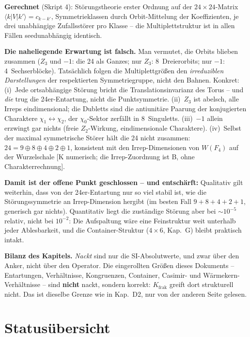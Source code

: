\documentclass[11pt]{report}
\begin{document}
\textbf{Gerechnet} (Skript 4): Störungstheorie erster Ordnung auf
der $24\times24$-Matrix $\langle k|V|k'\rangle = c_{k-k'}$,
Symmetrieklassen durch Orbit-Mittelung der Koeffizienten, je drei
unabhängige Zufallsstörer pro Klasse -- die Multiplettstruktur ist
in allen Fällen seedunabhängig identisch.

\textbf{Die naheliegende Erwartung ist falsch.} Man vermutet, die
Orbits blieben zusammen ($Z_3$ und $-1$: die 24 als Ganzes; nur
$Z_3$: 8~Dreierorbits; nur $-1$: 4~Sechserblöcke). Tatsächlich
folgen die Multiplettgrößen den \emph{irreduziblen Darstellungen}
der respektierten Symmetriegruppe, nicht den Bahnen. Konkret: (i)~Jede ortsabhängige Störung bricht die
Translationsinvarianz des Torus -- und \emph{die} trug die
24er-Entartung, nicht die Punktsymmetrie. (ii)~$Z_3$ ist abelsch,
alle Irreps eindimensional; die Dubletts sind die antiunitäre
Paarung der konjugierten Charaktere $\chi_1\leftrightarrow\chi_2$,
der $\chi_0$-Sektor zerfällt in 8~Singuletts. (iii)~$-1$ allein
erzwingt gar nichts (freie $Z_2$-Wirkung, eindimensionale
Charaktere). (iv)~Selbst der maximal symmetrische Störer hält die
24 nicht zusammen: $24 = 9\oplus8\oplus4\oplus2\oplus1$,
konsistent mit den Irrep-Dimensionen von $W(F_4)$ auf der
Wurzelschale [K numerisch; die Irrep-Zuordnung ist B, ohne
Charakterrechnung].

\textbf{Damit ist der offene Punkt geschlossen -- und entschärft:}
Qualitativ gilt weiterhin, dass von der 24er-Entartung nur so viel
stabil ist, wie die Störungssymmetrie an Irrep-Dimension hergibt
(im besten Fall $9+8+4+2+1$, generisch gar nichts). Quantitativ
liegt die zuständige Störung aber bei $\sim10^{-5}$ relativ, nicht
bei $10^{-2}$: Die Aufspaltung wäre eine Feinstruktur weit
unterhalb jeder Ablesbarkeit, und die Container-Struktur
($4\times6$, Kap.~G) bleibt praktisch intakt.

\textbf{Bilanz des Kapitels.} \emph{Nackt} sind nur die
SI-Absolutwerte, und zwar über den Anker, nicht über den
Operator. Die eingerollten Größen dieses Dokuments --
Entartungen, Verhältnisse, Kongruenzen, Container, Casimir- und
Wärmekern-Verhältnisse -- sind \textbf{nicht} nackt, sondern
korrekt: $K_\text{frak}$ greift dort strukturell nicht.
Das ist dieselbe Grenze wie in Kap.~D2, nur von der anderen
Seite gelesen.

\chapter{Statusübersicht}
\end{document}

